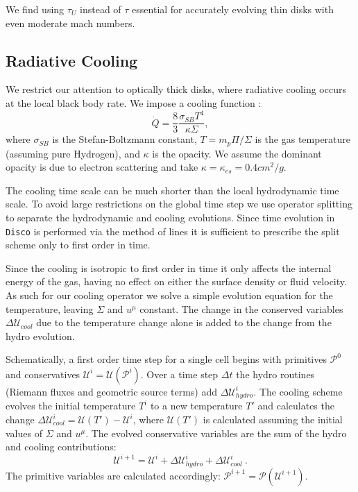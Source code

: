 \documentclass{emulateapj}
\newcommand{\De}{\Delta}
\newcommand{\sig}{\sigma}
\newcommand{\Sig}{\Sigma}
\newcommand{\ka}{\kappa}
\newcommand{\Disco}{{\texttt{Disco}}}
\begin{document}
We find using $\tau_U$ instead of $\tau$ essential for accurately evolving thin disks with even moderate mach numbers.

\subsection{Radiative Cooling}
\label{subsec:cooling}

We restrict our attention to optically thick disks, where radiative cooling occurs at the local black body rate. We impose a cooling function \citep{Novikov73, FrankKingRaine}:
\begin{equation}
	\dot{Q} = \frac{8}{3} \frac{\sig_{SB} T^4}{\ka \Sig} , \label{eq:BBcooling}
\end{equation}
where $\sig_{SB}$ is the Stefan-Boltzmann constant, $T = m_p \Pi / \Sig$ is the gas temperature (assuming pure Hydrogen), and $\ka $ is the opacity.  We assume the dominant opacity is due to electron scattering and take $\ka = \ka_{es} = 0.4 cm^2/g$.

The cooling time scale can be much shorter than the local hydrodynamic time scale.  To avoid large restrictions on the global time step we use operator splitting to separate the hydrodynamic and cooling evolutions.  Since time evolution in \Disco{} is performed via the method of lines it is sufficient to prescribe the split scheme only to first order in time.

Since the cooling is isotropic to first order in time it only affects the internal energy of the gas, having no effect on either the surface density or fluid velocity.  As such for our cooling operator we solve a simple evolution equation for the temperature, leaving $\Sig$ and $u^\mu$ constant.  The change in the conserved variables $\De \mathcal{U}_{cool}$ due to the temperature change alone is added to the change from the hydro evolution.

Schematically, a first order time step for a single cell begins with primitives $\mathcal{P}^0$ and conservatives $\mathcal{U}^i = \mathcal{U}(\mathcal{P}^i)$.  Over a time step $\De t$ the hydro routines (Riemann fluxes and geometric source terms) add $\De \mathcal{U}^i_{hydro}$.  The cooling scheme evolves the initial temperature $T^i$ to a new temperature $T'$ and calculates the change $\De \mathcal{U}^i_{cool} = \mathcal{U}(T') - \mathcal{U}^i$, where $\mathcal{U}(T')$ is calculated assuming the initial values of $\Sig$ and $u^\mu$.  The evolved conservative variables are the sum of the hydro and cooling contributions: 
\begin{equation}
	\mathcal{U}^{i+1} = \mathcal{U}^i + \De \mathcal{U}^i_{hydro} + \De \mathcal{U}^i_{cool} \ . \label{eq:opsplitU}
\end{equation}
The primitive variables are calculated accordingly: $\mathcal{P}^{i+1} = \mathcal{P}(\mathcal{U}^{i+1})$.
\end{document}
